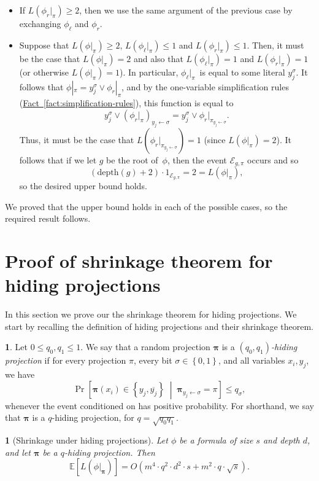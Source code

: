 \documentclass[11pt]{article}
\makeatletter
\numberwithin{equation}{section}
\theoremstyle{definition}
\theoremstyle{plain}
\newcommand{\expref}[2]{\hyperref[#2]{#1~\ref{#2}}}
\theoremstyle{definition}\newtheorem{notation}[theorem]{Notation}\theoremstyle{plain}
\newcommand{\E}{\mathbb{E}}
\newcommand{\B}{\left\{ 0,1 \right \}}
\newcommand{\p}{\boldsymbol{\pi}}
\newcommand{\dpt}{\mathrm{depth}}
\newcommand{\cE}{\mathcal{E}}
\theoremstyle{definition}
\newtheorem*{rep@definition}{\rep@ref}
\newenvironment{repdefinition}[1]{
 \def\rep@ref{#1}
 \begin{rep@definition}}
 {\end{rep@definition}}
\theoremstyle{plain}
\newtheorem*{restated@theorem}{\rep@title}
\newenvironment{restated}[1]{%
	 \def\rep@title{#1}%
	 \begin{restated@theorem}}%
	{\end{restated@theorem}}
\makeatother
\begin{document}
\begin{itemize}
as required. 
\item If $L(\phi_{r}|_{\pi})\ge2$, then we use the same argument of the
previous case by exchanging $\phi_{\ell}$ and $\phi_{r}$. 
\item Suppose that $L(\phi|_{\pi})\ge2$, $L(\phi_{\ell}|_{\pi})\le1$ and
$L(\phi_{r}|_{\pi})\le1$. Then, it must be the case that $L(\phi|_{\pi})=2$
and also that $L(\phi_{\ell}|_{\pi})=1$ and $L(\phi_{r}|_{\pi})=1$
(or otherwise $L(\phi|_{\pi})=1$). In particular, $\phi_{\ell}|_{\pi}$~is
equal to some literal $y_{j}^{\sigma}$. It follows that $\phi|_{\pi}=y_{j}^{\sigma}\vee\phi_{r}|_{\pi}$,
and by the one-variable simplification rules 
(\expref{Fact}{fact:simplification-rules}),
this function is equal to 
\[
y_{j}^{\sigma}\vee\left(\phi_{r}|_{\pi}\right)_{y_{j}\gets\sigma}=y_{j}^{\sigma}\vee\phi_{r}|_{\pi_{y_{j}\gets\sigma}}.
\]
Thus, it must be the case that $L(\phi_{r}|_{\pi_{y_{j}\gets\sigma}})=1$
(since $L(\phi|_{\pi})=2$). It follows that if we let $g$ be the
root of~$\phi$, then the event $\cE_{g,\pi}$ occurs and so 
\[
(\dpt(g)+2)\cdot1_{\cE_{g,\pi}}=2=L(\phi|_{\pi}),
\]
so the desired upper bound holds. 
\end{itemize}
We proved that the upper bound holds in each of the possible cases,
so the required result follows.

\section{\label{sec:shrinkage-hiding}Proof of shrinkage theorem for hiding
projections}

In this section we prove our the shrinkage theorem for hiding projections.
We start by recalling the definition of hiding projections and their
shrinkage theorem.
\begin{repdefinition}{\expref{Definition}{def:hiding-projections}}
Let $0\leq q_{0},q_{1}\leq1$. We say that a random projection $\p$
is a \emph{$(q_{0},q_{1})$-hiding projection} if for every projection
$\pi$, every bit $\sigma\in\B$, and all variables $x_{i},y_{j}$,
we have 
\[
\Pr\!\left[\p(x_{i})\in\left\{ y_{j},\overline{y_{j}}\right\} \;\middle|\;\p_{y_{j}\gets\sigma}=\pi\right]\leq q_{\sigma},
\]
whenever the event conditioned on has positive probability. For shorthand,
we say that $\p$ is a $q$-hiding projection, for $q=\sqrt{q_{0}q_{1}}$. 
\end{repdefinition}

\begin{restated}{\expref{Theorem}{thm:shrinkage-hiding}}[Shrinkage under hiding projections]
Let $\phi$ be a formula of size $s$ and depth $d$, and let $\p$
be a $q$-hiding projection. Then 
\[
\E\left[L(\phi|_{\p})\right]=O\!\left(m^{4}\cdot q^{2}\cdot d^{2}\cdot s+m^{2}\cdot q\cdot\sqrt{s}\right).
\]
\end{restated}
\end{document}
